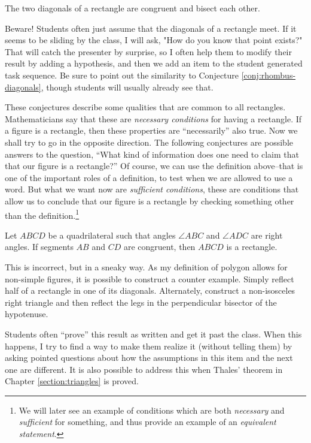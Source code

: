 \begin{conjecture}\label{conj:rectangle-diagonals}
The two diagonals of a rectangle are congruent and bisect each other.
\end{conjecture}

\begin{annotation}
{
\color{blue}
Beware! Students often just assume that the diagonals of a rectangle meet. If it seems to be sliding by the class, I will ask, "How do you know that point exists?" That will catch the presenter by surprise, so I often help them to modify their result by adding a hypothesis, and then we add an item to the student generated task sequence. Be sure to point out the similarity to Conjecture \ref{conj:rhombus-diagonals}, though students will usually already see that.
}
\end{annotation}


These conjectures describe some qualities that are common to all rectangles. Mathematicians say that these are \emph{necessary conditions} for having a rectangle.
If a figure is a rectangle, then these properties are ``necessarily'' also true. Now we shall try to go in the opposite direction.
The following conjectures are possible answers to the question, ``What kind of information does one need to claim that that our figure is a rectangle?''
Of course, we can use the definition above--that is one of the important roles of a definition, to test when we are allowed to use a word.
But what we want now are \emph{sufficient conditions}, these are conditions that allow us to conclude that our figure is a rectangle by checking something other than the definition.\footnote{We will later see an example of conditions which are both
\emph{necessary} and \emph{sufficient} for something, and thus provide an example of an \emph{equivalent statement}.}




\begin{conjecture}\label{conj:opp-congruent-implies-rectangle}
Let $ABCD$ be a quadrilateral such that angles $\angle ABC$ and $\angle ADC$ are right angles.
If segments $AB$ and $CD$ are congruent, then $ABCD$ is a rectangle.
\end{conjecture}

\begin{annotation}
{
\color{blue}
This is incorrect, but in a sneaky way. As my definition of polygon allows for non-simple figures, it is possible to construct a counter example. Simply reflect half of a rectangle in one of its diagonals. Alternately, construct a non-isosceles right triangle and then reflect the legs in the perpendicular bisector of the hypotenuse.

Students often ``prove'' this result as written and get it past the class. When this happens, I try to find a way to make them realize it (without telling them) by asking pointed questions about how the assumptions in this item and the next one are different. 
It is also possible to address this when Thales' theorem in Chapter \ref{section:triangles} is proved.
}
\end{annotation}

